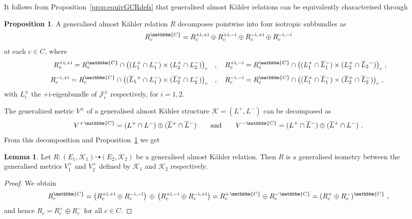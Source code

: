 \documentclass[a4paper, reqno, 11pt]{amsart}
\numberwithin{equation}{section}
\theoremstyle{definition}
\newtheorem{proposition}[equation]{Proposition}
\newtheorem{lemma}[equation]{Lemma}
\newcommand{\ii}{\mathrm{i}}
\newcommand{\IC}{\mathbbm{C}}
\newcommand{\cK}{{\mathcal K}}
\newcommand{\cJ}{{\mathcal J}}
\newcommand{\rel}{\dashrightarrow}
\theoremstyle{remark}
\begin{document}
It follows from Proposition~\ref{prop:equivGCRdefs} that generalised almost K\"ahler relations can be equivalently characterised through

\begin{proposition} \label{prop:GKRdecomp}
    A generalised almost K\"ahler relation $R$ decomposes pointwise into four isotropic subbundles as
    \begin{align}
        R_c^\IC = R_c^{+\ii,+\ii} \oplus R_c^{+\ii,-\ii} \oplus R_c^{-\ii,+\ii} \oplus R_c^{-\ii,-\ii}
    \end{align}
    at each $c\in C$, where 
    \begin{align} 
    R_c^{+\ii,+\ii} = R^\IC_c \cap \big((L_1^+\cap L_1^-)\times (L_2^+\cap L_2^-)\big)_c \quad & , \quad R_c^{+\ii,-\ii} = R_c^\IC \cap \big((L_1^+\cap \overline L{}_1^-)\times (L_2^+\cap \overline L_2{}^-)\big)_c \ , \\[4pt]
    R_c^{-\ii,+\ii} = R^\IC_c \cap \big((\overline L_1{}^+\cap L_1^-)\times (\overline L{}_2^+\cap L_2^-)\big)_c \quad & , \quad R_c^{-\ii,-\ii} = R_c^\IC \cap \big((\overline L{}_1^+\cap \overline L{}_1^-)\times (\overline L{}_2^+\cap \overline L{}_2^-)\big)_c \ ,
    \end{align}
    with $L_i^\pm$ the $+\ii$-eigenbundle of $\cJ_i^\pm$ respectively, for $i=1,2$.
\end{proposition}

The generalized metric $V^\pm$ of a generalised almost K\"ahler structure $\cK = (L^+,L^-)$ can be decomposed as $$V^+{}^\IC = (L^+\cap L^- )\oplus (\overline{L}{}^+\cap \overline{L}{}^-) \qquad \text{and} \qquad V^-{}^\IC = (L^+\cap \overline L{}^-) \oplus (\overline{L}{}^+\cap L^-) \ . $$ From this decomposition and Proposition~\ref{prop:GKRdecomp} we get

\begin{lemma}
Let $R\colon (E_1, \cK_1) \rel (E_2, \cK_2)$ be a generalised almost K\"{a}hler relation. Then $R$ is a generalised isometry between the generalised metrics $V_1^+$ and $V_2^+$ defined by $\cK_1$ and $\cK_2$ respectively. 
\end{lemma}

\begin{proof}
    We obtain
    \begin{align}
        R^\IC_c = \big(R_c^{+\ii,+\ii} \oplus R_c^{-\ii,-\ii}\big) \, \oplus \, \big(R_c^{+\ii,-\ii} \oplus R_c^{-\ii,+\ii}\big) = R_c^+{}^\IC \oplus R^-_c{}^\IC = (R^+_c\oplus R_c^-)^\IC \ ,
    \end{align}
    and hence $R_c = R_c^+ \oplus R_c^-$ for all $c\in C$.
\end{proof}
\end{document}
